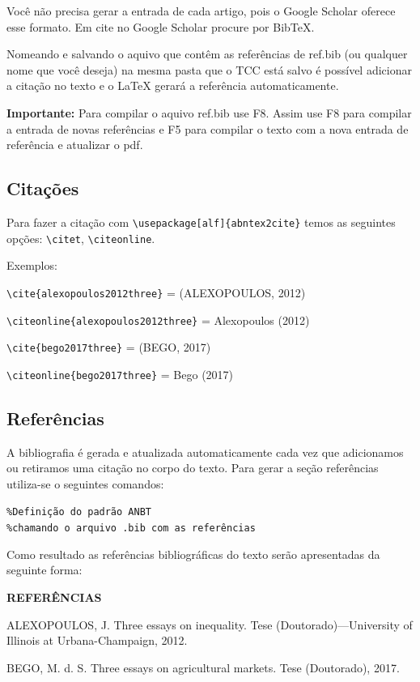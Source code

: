 \documentclass[12pt,oneside,a4paper,chapter=TITLE,english,brazil,sumario=abnt-6027-2012]{abntex2}
\begin{document}
Você não precisa gerar a entrada de cada artigo, pois o Google Scholar oferece esse formato. Em cite no Google Scholar procure por BibTeX. 

Nomeando e salvando o aquivo que contêm as referências de ref.bib (ou qualquer nome que você deseja) na mesma pasta que o TCC está salvo é possível adicionar a citação no texto e o \LaTeX \hspace{0.1cm} gerará a referência automaticamente. 

{{\bfseries Importante:} Para compilar o aquivo ref.bib use F8}. Assim use F8 para compilar a entrada de novas referências e F5  para compilar o texto com a nova entrada de referência e atualizar o pdf.  

\subsection{Citações}

Para fazer a citação com \verb|\usepackage[alf]{abntex2cite}| temos as seguintes opções: \verb|\citet|,  \verb|\citeonline|.

Exemplos: 

\verb|\cite{alexopoulos2012three}| = (ALEXOPOULOS, 2012)

\verb|\citeonline{alexopoulos2012three}| = Alexopoulos (2012)

\verb|\cite{bego2017three}| = (BEGO, 2017)

\verb|\citeonline{bego2017three}| = Bego (2017)

\subsection{Referências}

A bibliografia é gerada e atualizada automaticamente cada vez que adicionamos ou retiramos uma citação no corpo do texto. Para gerar a seção referências utiliza-se o seguintes comandos:  

\vspace{1cm}
{
	\noindent
	\verb|%Definição do padrão ANBT| \\
	\verb|%chamando o arquivo .bib com as referências | \\
}

Como resultado as referências bibliográficas do texto serão apresentadas da seguinte forma: 

\vspace{1cm}
\begin{center}
	\large \bfseries REFERÊNCIAS
\end{center}

{
\noindent
ALEXOPOULOS, J. Three essays on inequality. Tese (Doutorado)—University of Illinois at
Urbana-Champaign, 2012.

\noindent
BEGO, M. d. S. Three essays on agricultural markets. Tese (Doutorado), 2017.
}
\end{document}
